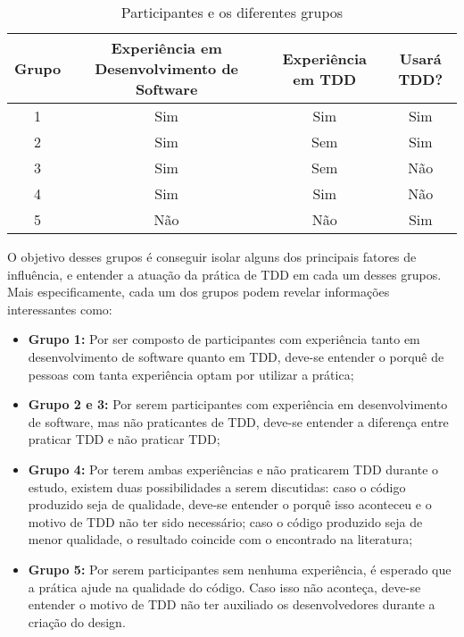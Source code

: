 \begin{table}
	\caption{Participantes e os diferentes grupos}
	\begin{tabular}{c | c | c | c |}
		\hline
		Grupo & Experiência em Desenvolvimento de Software & Experiência em TDD & Usará TDD? \\ 	\hline
		1 & Sim & Sim & Sim \\ 	\hline
		2 & Sim & Sem & Sim \\ 	\hline
		3 & Sim & Sem & Não \\ 	\hline
		4 & Sim & Sim & Não \\ 	\hline
		5 & Não & Não & Sim \\ 	\hline
	\end{tabular}
\end{table}

O objetivo desses grupos é conseguir isolar alguns dos principais fatores de influência,
e entender a atuação da prática de TDD em cada um desses grupos. Mais especificamente,
cada um dos grupos podem revelar informações interessantes como:

\begin{itemize}
	\item \textbf{Grupo 1:} Por ser composto de participantes com experiência tanto
	em desenvolvimento de software quanto em TDD, deve-se entender o porquê de
	pessoas com tanta experiência optam por utilizar a prática;
	
	\item \textbf{Grupo 2 e 3:} Por serem participantes com experiência em desenvolvimento
	de software, mas não praticantes de TDD, deve-se entender a diferença entre
	praticar TDD e não praticar TDD;
	
	\item \textbf{Grupo 4:} Por terem ambas experiências e não praticarem TDD durante o estudo,
	existem duas possibilidades a serem discutidas: caso o código produzido seja de qualidade, 
	deve-se entender o porquê isso aconteceu e o motivo de TDD não ter sido necessário; 
	caso o código produzido seja de menor qualidade, o resultado coincide com o encontrado na
	literatura;
	
	\item \textbf{Grupo 5:} Por serem participantes sem nenhuma experiência, é esperado que
	a prática ajude na qualidade do código. Caso isso não aconteça, deve-se entender o motivo de TDD
	não ter auxiliado os desenvolvedores durante a criação do design.
\end{itemize}

